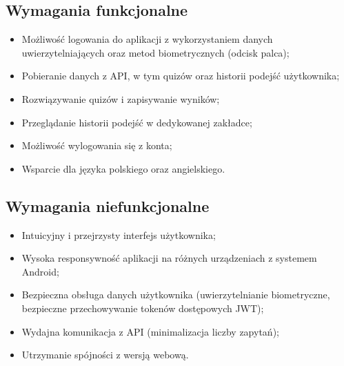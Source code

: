 \documentclass{article}
\begin{document}
	\subsection{Wymagania funkcjonalne}
	\begin{itemize}
		\item Możliwość logowania do aplikacji z wykorzystaniem danych uwierzytelniających oraz metod biometrycznych (odcisk palca);
		\item Pobieranie danych z API, w tym quizów oraz historii podejść użytkownika;
		\item Rozwiązywanie quizów i zapisywanie wyników;
		\item Przeglądanie historii podejść w dedykowanej zakładce;
		\item Możliwość wylogowania się z konta;
		\item Wsparcie dla języka polskiego oraz angielskiego.
	\end{itemize}
	
	\subsection{Wymagania niefunkcjonalne}
	\begin{itemize}
		\item Intuicyjny i przejrzysty interfejs użytkownika;
		\item Wysoka responsywność aplikacji na różnych urządzeniach z systemem Android;
		\item Bezpieczna obsługa danych użytkownika (uwierzytelnianie biometryczne, bezpieczne przechowywanie tokenów dostępowych JWT);
		\item Wydajna komunikacja z API (minimalizacja liczby zapytań);
		\item Utrzymanie spójności z wersją webową.
	\end{itemize}
\end{document}
